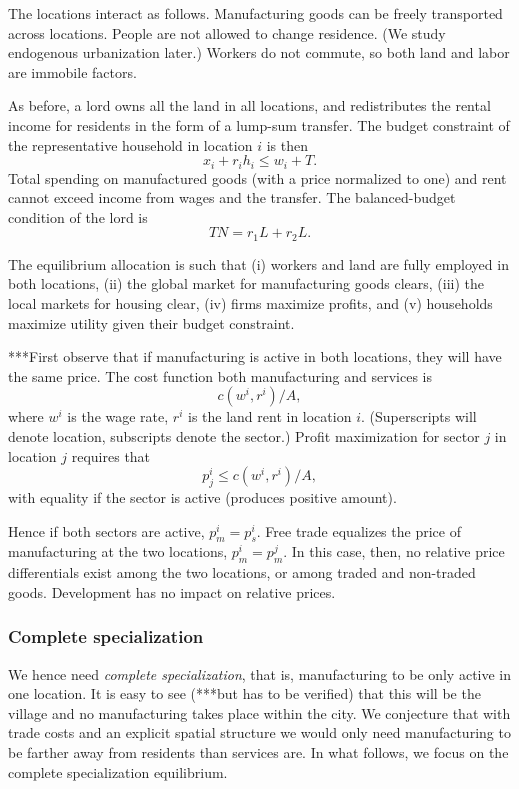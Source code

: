 \documentclass[12pt]{article}
\begin{document}
The locations interact as follows. Manufacturing goods can be freely transported across locations. People are not allowed to change residence. (We study endogenous urbanization later.) Workers do not commute, so both land and labor are immobile factors.

As before, a lord owns all the land in all locations, and redistributes the rental income for residents in the form of a lump-sum transfer. The budget constraint of the representative household in location $i$ is then
\[
x_i + r_i h_i \le w_i + T.
\]
Total spending on manufactured goods (with a price normalized to one) and rent cannot exceed income from wages and the transfer. The balanced-budget condition of the lord is
\[
TN = r_1L+r_2L.
\]

The equilibrium allocation is such that (i) workers and land are fully employed in both locations, (ii) the global market for manufacturing goods clears, (iii) the local markets for housing clear, (iv) firms maximize profits, and (v) households maximize utility given their budget constraint.

***First observe that if manufacturing is active in both locations, they will have the same price. The cost function both manufacturing and services is
\[
c(w^i,r^i)/A,
\]
where $w^i$ is the wage rate, $r^i$ is the land rent in location $i$. (Superscripts will denote location, subscripts denote the sector.) Profit maximization for sector $j$ in location $j$ requires that
\[
p_j^i \le c(w^i,r^i)/A,
\]
with equality if the sector is active (produces positive amount).

Hence if both sectors are active, $p_m^i = p_s^i$. Free trade equalizes the price of manufacturing at the two locations, $p_m^i = p_m^j$. In this case, then, no relative price differentials exist among the two locations, or among traded and non-traded goods. Development has no impact on relative prices.

\subsubsection{Complete specialization}

We hence need \emph{complete specialization}, that is, manufacturing to be only active in one location. It is easy to see (***but has to be verified) that this will be the village and no manufacturing takes place within the city. We conjecture that with trade costs and an explicit spatial structure we would only need manufacturing to be farther away from residents than services are. In what follows, we focus on the complete specialization equilibrium.
\end{document}
